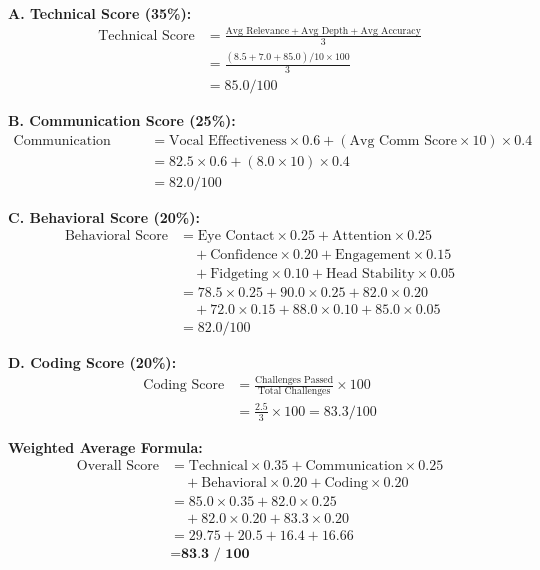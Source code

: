 \documentclass[12pt,a4paper]{article}
\begin{document}
\begin{tcolorbox}[colback=warningyellow!5,colframe=warningyellow,title=\textbf{STEP 3: Calculate Category Scores}]

\textbf{A. Technical Score (35\%):}
\begin{align*}
\text{Technical Score} &= \frac{\text{Avg Relevance} + \text{Avg Depth} + \text{Avg Accuracy}}{3} \\
&= \frac{(8.5 + 7.0 + 85.0)/10 \times 100}{3} \\
&= 85.0 / 100
\end{align*}

\textbf{B. Communication Score (25\%):}
\begin{align*}
\text{Communication Score} &= \text{Vocal Effectiveness} \times 0.6 + (\text{Avg Comm Score} \times 10) \times 0.4 \\
&= 82.5 \times 0.6 + (8.0 \times 10) \times 0.4 \\
&= 82.0 / 100
\end{align*}

\textbf{C. Behavioral Score (20\%):}
\begin{align*}
\text{Behavioral Score} &= \text{Eye Contact} \times 0.25 + \text{Attention} \times 0.25 \\
&\quad + \text{Confidence} \times 0.20 + \text{Engagement} \times 0.15 \\
&\quad + \text{Fidgeting} \times 0.10 + \text{Head Stability} \times 0.05 \\
&= 78.5 \times 0.25 + 90.0 \times 0.25 + 82.0 \times 0.20 \\
&\quad + 72.0 \times 0.15 + 88.0 \times 0.10 + 85.0 \times 0.05 \\
&= 82.0 / 100
\end{align*}

\textbf{D. Coding Score (20\%):}
\begin{align*}
\text{Coding Score} &= \frac{\text{Challenges Passed}}{\text{Total Challenges}} \times 100 \\
&= \frac{2.5}{3} \times 100 = 83.3 / 100
\end{align*}
\end{tcolorbox}

\vspace{0.5cm}

\begin{tcolorbox}[colback=dangerred!5,colframe=dangerred,title=\textbf{STEP 4: Calculate Overall Score}]
\textbf{Weighted Average Formula:}
\begin{align*}
\text{Overall Score} &= \text{Technical} \times 0.35 + \text{Communication} \times 0.25 \\
&\quad + \text{Behavioral} \times 0.20 + \text{Coding} \times 0.20 \\
&= 85.0 \times 0.35 + 82.0 \times 0.25 \\
&\quad + 82.0 \times 0.20 + 83.3 \times 0.20 \\
&= 29.75 + 20.5 + 16.4 + 16.66 \\
&= \textbf{83.3 / 100}
\end{align*}
\end{tcolorbox}
\end{document}

